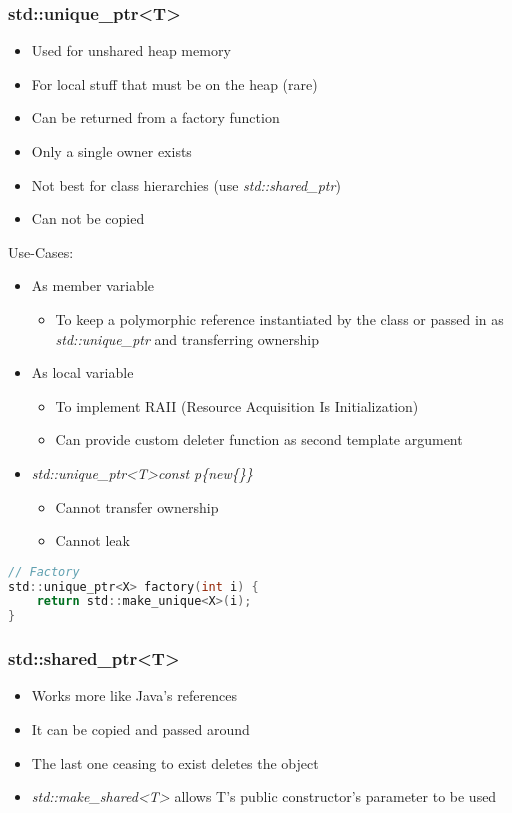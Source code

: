 \subsubsection{std::unique\_ptr\textless T\textgreater}
\begin{itemize}
    \item Used for unshared heap memory
    \item For local stuff that must be on the heap (rare)
    \item Can be returned from a factory function
    \item Only a single owner exists
    \item Not best for class hierarchies (use \textit{std::shared\_ptr})
    \item Can not be copied
\end{itemize}
\vspace{1em}
Use-Cases:
\begin{itemize}
    \item As member variable
    \begin{itemize}
        \item To keep a polymorphic reference instantiated by the class or passed in as \textit{std::unique\_ptr} and transferring ownership
    \end{itemize}
    \item As local variable
    \begin{itemize}
        \item To implement RAII (Resource Acquisition Is Initialization)
        \item Can provide custom deleter function as second template argument
    \end{itemize}
    \item \textit{std::unique\_ptr\textless T\textgreater const p\{new\{\}\}}
    \begin{itemize}
        \item Cannot transfer ownership
        \item Cannot leak
    \end{itemize}
\end{itemize}
\begin{lstlisting}[style=frame, style= linenumbers, language=C]
// Factory
std::unique_ptr<X> factory(int i) {
    return std::make_unique<X>(i);
}
\end{lstlisting}

\pagebreak

\subsubsection{std::shared\_ptr\textless T\textgreater}
\begin{itemize}
    \item Works more like Java's references
    \item It can be copied and passed around
    \item The last one ceasing to exist deletes the object
    \item \textit{std::make\_shared\textless T\textgreater} allows T's public constructor's parameter to be used
\end{itemize}

